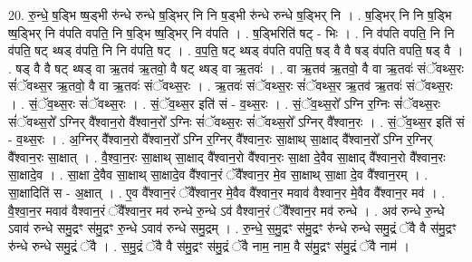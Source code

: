 \documentclass[17pt]{extarticle}
\begin{document}
20. रु॒न्धे॒ ष॒ड्भि ष्ष॒ड्भी रु॑न्धे रुन्धे ष॒ड्भिर् नि नि ष॒ड्भी रु॑न्धे रुन्धे ष॒ड्भिर् नि । . ष॒ड्भिर् नि नि ष॒ड्भि ष्ष॒ड्भिर् नि व॑पति वपति॒ नि ष॒ड्भि ष्ष॒ड्भिर् नि व॑पति । . ष॒ड्भिरिति॑ षट् - भिः । . नि व॑पति वपति॒ नि नि व॑पति॒ षट् थ्षड् व॑पति॒ नि नि व॑पति॒ षट् । . व॒प॒ति॒ षट् थ्षड् व॑पति वपति॒ षड् वै वै षड् व॑पति वपति॒ षड् वै । . षड् वै वै षट् थ्षड् वा ऋ॒तव॑ ऋ॒तवो॒ वै षट् थ्षड् वा ऋ॒तवः॑ । . वा ऋ॒तव॑ ऋ॒तवो॒ वै वा ऋ॒तवः॑ संॅवथ्स॒रः सं॑ॅवथ्स॒र ऋ॒तवो॒ वै वा ऋ॒तवः॑ संॅवथ्स॒रः । . ऋ॒तवः॑ संॅवथ्स॒रः सं॑ॅवथ्स॒र ऋ॒तव॑ ऋ॒तवः॑ संॅवथ्स॒रः । . सं॒ॅव॒थ्स॒रः सं॑ॅवथ्स॒रः । . सं॒ॅव॒थ्स॒र इति॑ सं - व॒थ्स॒रः । . सं॒ॅव॒थ्स॒रो᳚ ऽग्नि र॒ग्निः सं॑ॅवथ्स॒रः सं॑ॅवथ्स॒रो᳚ ऽग्निर् वै᳚श्वान॒रो वै᳚श्वान॒रो᳚ ऽग्निः सं॑ॅवथ्स॒रः सं॑ॅवथ्स॒रो᳚ ऽग्निर् वै᳚श्वान॒रः । . सं॒ॅव॒थ्स॒र इति॑ सं - व॒थ्स॒रः । . अ॒ग्निर् वै᳚श्वान॒रो वै᳚श्वान॒रो᳚ ऽग्नि र॒ग्निर् वै᳚श्वान॒रः सा॒क्षाथ् सा॒क्षाद् वै᳚श्वान॒रो᳚ ऽग्नि र॒ग्निर् वै᳚श्वान॒रः सा॒क्षात् । . वै॒श्वा॒न॒रः सा॒क्षाथ् सा॒क्षाद् वै᳚श्वान॒रो वै᳚श्वान॒रः सा॒क्षा दे॒वैव सा॒क्षाद् वै᳚श्वान॒रो वै᳚श्वान॒रः सा॒क्षादे॒व । . सा॒क्षा दे॒वैव सा॒क्षाथ् सा॒क्षादे॒व वै᳚श्वान॒रं ॅवै᳚श्वान॒र मे॒व सा॒क्षाथ् सा॒क्षा दे॒व वै᳚श्वान॒रम् । . सा॒क्षादिति॑ स - अ॒क्षात् । . ए॒व वै᳚श्वान॒रं ॅवै᳚श्वान॒र मे॒वैव वै᳚श्वान॒र मवाव॑ वैश्वान॒र मे॒वैव वै᳚श्वान॒र मव॑ । . वै॒श्वा॒न॒र मवाव॑ वैश्वान॒रं ॅवै᳚श्वान॒र मव॑ रुन्धे रु॒न्धे ऽव॑ वैश्वान॒रं ॅवै᳚श्वान॒र मव॑ रुन्धे । . अव॑ रुन्धे रु॒न्धे ऽवाव॑ रुन्धे समु॒द्रꣳ स॑मु॒द्रꣳ रु॒न्धे ऽवाव॑ रुन्धे समु॒द्रम् । . रु॒न्धे॒ स॒मु॒द्रꣳ स॑मु॒द्रꣳ रु॑न्धे रुन्धे समु॒द्रं ॅवै वै स॑मु॒द्रꣳ रु॑न्धे रुन्धे समु॒द्रं ॅवै । . स॒मु॒द्रं ॅवै वै स॑मु॒द्रꣳ स॑मु॒द्रं ॅवै नाम॒ नाम॒ वै स॑मु॒द्रꣳ स॑मु॒द्रं ॅवै नाम॑ । \newline
\end{document}
